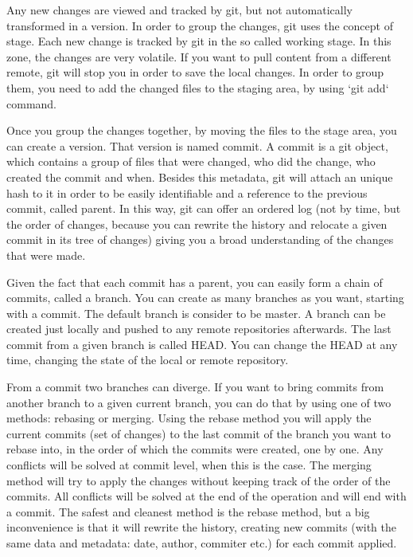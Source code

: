         Any new changes are viewed and tracked by git, but not automatically transformed in a version. In order to group the changes, git uses the concept of stage. Each new change is tracked by git in the so called working stage. In this zone, the changes are very volatile. If you want to pull content from a different remote, git will stop you in order to save the local changes. In order to group them, you need to add the changed files to the staging area, by using `git add` command.
        
        Once you group the changes together, by moving the files to the stage area, you can create a version. That version is named commit. A commit is a git object, which contains a group of files that were changed, who did the change, who created the commit and when. Besides this metadata, git will attach an unique hash to it in order to be easily identifiable and a reference to the previous commit, called parent. In this way, git can offer an ordered log (not by time, but the order of changes, because you can rewrite the history and relocate a given commit in its tree of changes) giving you a broad understanding of the changes that were made.
        
        Given the fact that each commit has a parent, you can easily form a chain of commits, called a branch. You can create as many branches as you want, starting with a commit. The default branch is consider to be master. A branch can be created just locally and pushed to any remote repositories afterwards. The last commit from a given branch is called HEAD.
        You can change the HEAD at any time, changing the state of the local or remote repository.
        
        From a commit two branches can diverge. If you want to bring commits from another branch to a given current branch, you can do that by using one of two methods: rebasing or merging. 
        Using the rebase method you will apply the current commits (set of changes) to the last commit of the branch you want to rebase into, in the order of which the commits were created, one by one. Any conflicts will be solved at commit level, when this is the case. 
        The merging method will try to apply the changes without keeping track of the order of the commits. All conflicts will be solved at the end of the operation and will end with a commit. 
        The safest and cleanest method is the rebase method, but a big inconvenience is that it will rewrite the history, creating new commits (with the same data and metadata: date, author, commiter etc.) for each commit applied.
        
